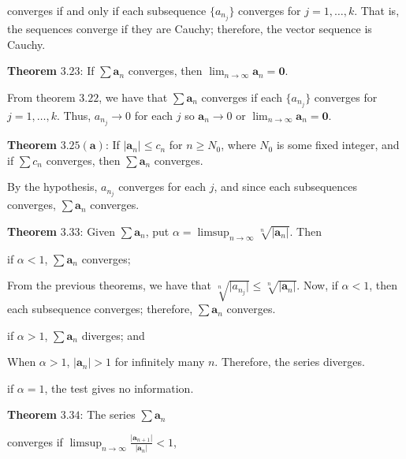 \begin{exercise}
  converges if and only if each subsequence \(\{a_{n_j}\}\) converges for
  \(j = 1,\ldots,k\).
  That is, the sequences converge if they are Cauchy; therefore, the vector
  sequence is Cauchy.
  \par\smallskip
  \textbf{Theorem} \(\mathbold{3.23}\): If \(\sum\mathbold{a}_n\) converges,
  then \(\lim_{n\to\infty}\mathbold{a}_n = \mathbold{0}\).
  \par\smallskip
  From theorem \(3.22\), we have that \(\sum\mathbold{a}_n\) converges if each
  \(\{a_{n_j}\}\) converges for \(j = 1,\ldots,k\).
  Thus, \(a_{n_j}\to 0\) for each \(j\) so \(\mathbold{a}_n\to 0\) or
  \(\lim_{n\to\infty}\mathbold{a}_n = \mathbold{0}\).
  \par\smallskip
  \textbf{Theorem} \(\mathbold{3.25(a)}\): If
  \(\lvert\mathbold{a}_n\rvert\leq c_n\) for \(n\geq N_0\), where \(N_0\) is
  some fixed integer, and if \(\sum c_n\) converges, then
  \(\sum\mathbold{a}_n\) converges.
  \par\smallskip
  By the hypothesis, \(a_{n_j}\) converges for each \(j\), and since each
  subsequences converges, \(\sum\mathbold{a}_n\) converges.
  \par\smallskip
  \textbf{Theorem} \(\mathbold{3.33}\): Given \(\sum\mathbold{a}_n\), put
  \(\alpha = \limsup_{n\to\infty}\sqrt[n]{\lvert\mathbold{a}_n\vert}\).
  Then
  \begin{exercise}[label = (\alph*)]
  \item
    if \(\alpha < 1\), \(\sum\mathbold{a}_n\) converges;
    \par\smallskip
    From the previous theorems, we have that
    \(\sqrt[n]{\lvert a_{n_j}\rvert}\leq\sqrt[n]{\lvert\mathbold{a}_n\rvert}\).
    Now, if \(\alpha < 1\), then each subsequence converges; therefore,
    \(\sum\mathbold{a}_n\) converges.
  \item
    if \(\alpha > 1\), \(\sum\mathbold{a}_n\) diverges; and
    \par\smallskip
    When \(\alpha > 1\), \(\lvert\mathbold{a}_n\rvert > 1\) for infinitely
    many \(n\).
    Therefore, the series diverges.
  \item
    if \(\alpha = 1\), the test gives no information.
  \end{exercise}
  \textbf{Theorem} \(\mathbold{3.34}\): The series \(\sum\mathbold{a}_n\)
  \begin{exercise}[label = (\alph*)]
  \item
    converges if \(\limsup_{n\to\infty}\frac{\lvert\mathbold{a}_{n + 1}\rvert}
    {\lvert\mathbold{a}_n\rvert} < 1\),

\end{exercise}
\end{exercise}
